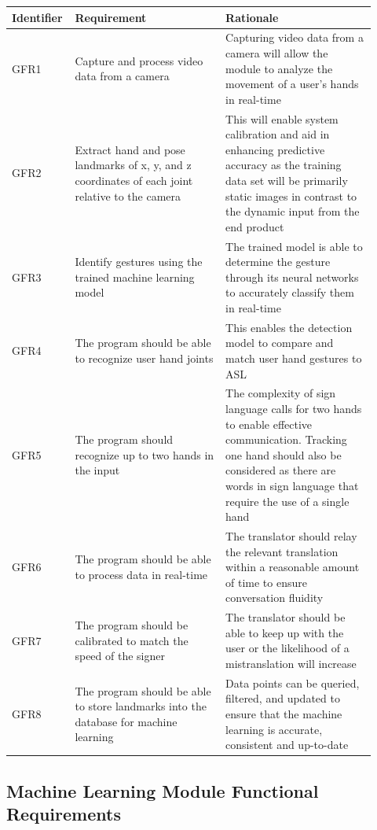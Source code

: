 \documentclass[12pt]{article}
\begin{document}
\renewcommand{\arraystretch}{1.2}
\noindent \begin{tabularx}{\textwidth}{p{0.12\linewidth}|p{0.4\linewidth}|p{0.4\linewidth}}
\toprule
\textbf{Identifier} & \textbf{Requirement} & \textbf{Rationale}\\
\midrule
GFR1 
& Capture and process video data from a camera 
& Capturing video data from a camera will allow the module to analyze the movement of a user's hands in real-time\\
\hline
GFR2
& Extract hand and pose landmarks of x, y, and z coordinates of each joint relative to the camera
& This will enable system calibration and aid in enhancing predictive accuracy as the training data set will be primarily static images in contrast to the dynamic input from the end product\\
\hline
GFR3
& Identify gestures using the trained machine learning model 
& The trained model is able to determine the gesture through its neural networks to accurately classify them in real-time\\
\hline
GFR4
& The program should be able to recognize user hand joints
& This enables the detection model to compare and match user hand gestures to ASL\\
\hline
GFR5
& The program should recognize up to two hands in the input
& The complexity of sign language calls for two hands to enable effective communication. Tracking one hand should also be considered as there are words in sign language that require the use of a single hand\\
\hline
GFR6
& The program should be able to process data in real-time
& The translator should relay the relevant translation within a reasonable amount of time to ensure conversation fluidity\\
\hline
GFR7
& The program should be calibrated to match the speed of the signer
& The translator should be able to keep up with the user or the likelihood of a mistranslation will increase\\
\hline
GFR8
& The program should be able to store landmarks into the database for machine learning
& Data points can be queried, filtered, and updated to ensure that the machine learning is accurate, consistent and up-to-date\\
\bottomrule
\end{tabularx}

\subsection{Machine Learning Module Functional Requirements}
\end{document}
